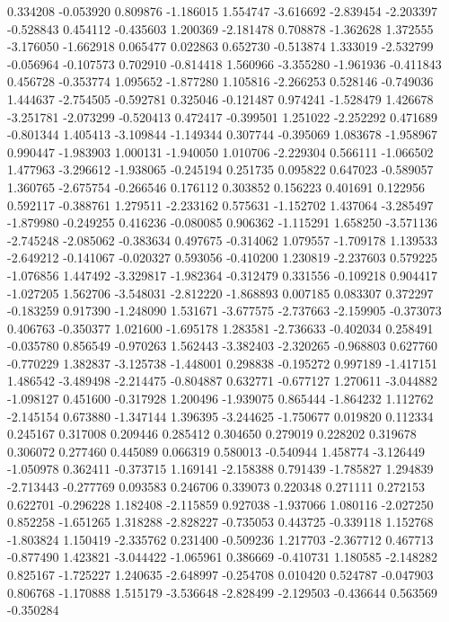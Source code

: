 0.334208
-0.053920
0.809876
-1.186015
1.554747
-3.616692
-2.839454
-2.203397
-0.528843
0.454112
-0.435603
1.200369
-2.181478
0.708878
-1.362628
1.372555
-3.176050
-1.662918
0.065477
0.022863
0.652730
-0.513874
1.333019
-2.532799
-0.056964
-0.107573
0.702910
-0.814418
1.560966
-3.355280
-1.961936
-0.411843
0.456728
-0.353774
1.095652
-1.877280
1.105816
-2.266253
0.528146
-0.749036
1.444637
-2.754505
-0.592781
0.325046
-0.121487
0.974241
-1.528479
1.426678
-3.251781
-2.073299
-0.520413
0.472417
-0.399501
1.251022
-2.252292
0.471689
-0.801344
1.405413
-3.109844
-1.149344
0.307744
-0.395069
1.083678
-1.958967
0.990447
-1.983903
1.000131
-1.940050
1.010706
-2.229304
0.566111
-1.066502
1.477963
-3.296612
-1.938065
-0.245194
0.251735
0.095822
0.647023
-0.589057
1.360765
-2.675754
-0.266546
0.176112
0.303852
0.156223
0.401691
0.122956
0.592117
-0.388761
1.279511
-2.233162
0.575631
-1.152702
1.437064
-3.285497
-1.879980
-0.249255
0.416236
-0.080085
0.906362
-1.115291
1.658250
-3.571136
-2.745248
-2.085062
-0.383634
0.497675
-0.314062
1.079557
-1.709178
1.139533
-2.649212
-0.141067
-0.020327
0.593056
-0.410200
1.230819
-2.237603
0.579225
-1.076856
1.447492
-3.329817
-1.982364
-0.312479
0.331556
-0.109218
0.904417
-1.027205
1.562706
-3.548031
-2.812220
-1.868893
0.007185
0.083307
0.372297
-0.183259
0.917390
-1.248090
1.531671
-3.677575
-2.737663
-2.159905
-0.373073
0.406763
-0.350377
1.021600
-1.695178
1.283581
-2.736633
-0.402034
0.258491
-0.035780
0.856549
-0.970263
1.562443
-3.382403
-2.320265
-0.968803
0.627760
-0.770229
1.382837
-3.125738
-1.448001
0.298838
-0.195272
0.997189
-1.417151
1.486542
-3.489498
-2.214475
-0.804887
0.632771
-0.677127
1.270611
-3.044882
-1.098127
0.451600
-0.317928
1.200496
-1.939075
0.865444
-1.864232
1.112762
-2.145154
0.673880
-1.347144
1.396395
-3.244625
-1.750677
0.019820
0.112334
0.245167
0.317008
0.209446
0.285412
0.304650
0.279019
0.228202
0.319678
0.306072
0.277460
0.445089
0.066319
0.580013
-0.540944
1.458774
-3.126449
-1.050978
0.362411
-0.373715
1.169141
-2.158388
0.791439
-1.785827
1.294839
-2.713443
-0.277769
0.093583
0.246706
0.339073
0.220348
0.271111
0.272153
0.622701
-0.296228
1.182408
-2.115859
0.927038
-1.937066
1.080116
-2.027250
0.852258
-1.651265
1.318288
-2.828227
-0.735053
0.443725
-0.339118
1.152768
-1.803824
1.150419
-2.335762
0.231400
-0.509236
1.217703
-2.367712
0.467713
-0.877490
1.423821
-3.044422
-1.065961
0.386669
-0.410731
1.180585
-2.148282
0.825167
-1.725227
1.240635
-2.648997
-0.254708
0.010420
0.524787
-0.047903
0.806768
-1.170888
1.515179
-3.536648
-2.828499
-2.129503
-0.436644
0.563569
-0.350284
